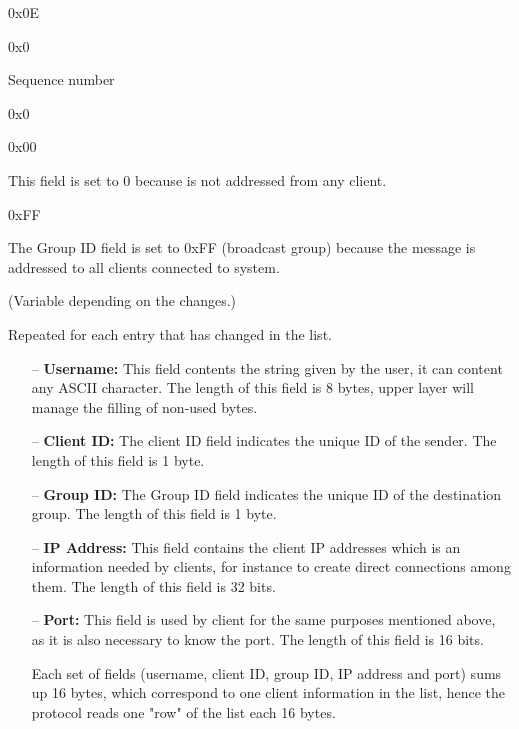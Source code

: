 \documentclass{article}
\begin{document}
\begin{description}[align=left]
    \item [Type:] 0x0E
    
    \item [Reserved:] 0x0
        
    \item [Sequence:] Sequence number
    
    \item [Acknowledgement:] 0x0
    
    \item [Source ID:] 0x00
    \begin{flushleft}
        This field is set to 0 because is not addressed from any client.
    \end{flushleft}
    
    \item [Group ID:] 0xFF
    \begin{flushleft}
        The Group ID field is set to 0xFF (broadcast group) because the message is addressed to all clients connected to system.
    \end{flushleft}
    
    \item [Header Length:] (Variable depending on the changes.)

    \item[Options:] Repeated for each entry that has changed in the list.
    
    \begin{itemize}
        \item[--]\textbf{Username:} This field contents the string given by the user, it can content any ASCII character. The length of this field is 8 bytes, upper layer will manage the filling of non-used bytes.
        \item[--]\textbf{Client ID:} The client ID field indicates the unique ID of the sender. The length of this field is 1 byte.
        \item[--]\textbf{Group ID:} The Group ID field indicates the unique ID of the destination group. The length of this field is 1 byte.
        \item[--]\textbf{IP Address:} This field contains the client IP addresses which is an information needed by clients, for instance to create direct connections among them. The length of this field is 32 bits.
        \item[--]\textbf{Port:} This field is used by client for the same purposes mentioned above, as it is also necessary to know the port. The length of this field is 16 bits.
        \begin{flushleft}
            Each set of fields (username, client ID, group ID, IP address and port) sums up 16 bytes, which correspond to one client information in the list, hence the protocol reads one "row" of the list each 16 bytes.
        \end{flushleft}
    
    \end{itemize}
\end{description}
\end{document}
